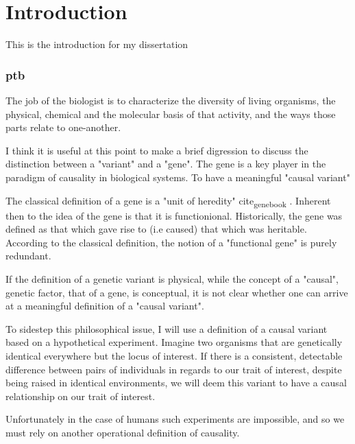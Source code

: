 \chapter{Introduction}
\label{introduction}

This is the introduction for my dissertation

\subsection{ptb}

The job of the biologist is to characterize the diversity of living organisms, the physical, chemical and the molecular basis of that activity, and the ways
those parts relate to one-another.

I think it is useful at this point to make a brief digression to discuss the distinction between a "variant" and a "gene". The gene is a key player in the paradigm of causality in biological systems. To have a meaningful "causal variant"

The classical definition of a gene is a "unit of heredity" cite\textsubscript{gene}\textsubscript{book} .  Inherent then to the idea of the gene is that it is functionional.  Historically,
the gene was defined as that which gave rise to (i.e caused) that which was heritable.
According to the classical definition, the notion of a "functional gene" is purely redundant.  

If the definition of a genetic variant is physical, while the concept of a "causal", genetic factor, that of a gene, is conceptual, 
it is not clear whether one can arrive at a meaningful definition of a "causal variant".  

To sidestep this philosophical issue, I will use a definition of a causal variant based on a hypothetical experiment.  Imagine two organisms that are
genetically identical everywhere but the locus of interest.  If there is a consistent, detectable difference between pairs of individuals in regards to our trait
 of interest, despite being raised in identical environments, we will deem this variant to have a causal relationship on our trait of interest.

Unfortunately in the case of humans such experiments are impossible, and so we must rely on another operational definition of causality.

